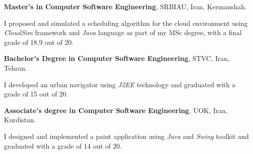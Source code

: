 
\begin{scholarship}
					{\textbf{Master's in Computer Software Engineering}, SRBIAU, Iran, Kermanshah.
		
  I proposed and simulated a scheduling algorithm for the cloud environment using \textit{CloudSim} framework and \textit{Java} language as part of my MSc degree, with a final grade of 18.9 out of 20.	\vspace{5 pt}			
     }
			
					{\textbf{Bachelor's Degree in Computer Software Engineering}, STVC,  Iran, Tehran.
     
     I developed an urban navigator using \textit{J2EE} technology and graduated with a grade of 15 out of 20. \vspace{5 pt}	
     }		
					{\textbf{Associate's degree in Computer Software Engineering}, UOK, Iran, Kurdistan.
     
     I designed and implemented a paint application using \textit{Java} and \textit{Swing} toolkit and graduated with a grade of 14 out of 20.
     }
    
\end{scholarship}
